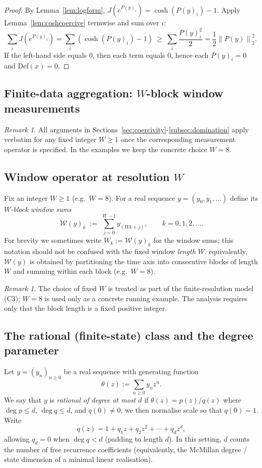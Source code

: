 \documentclass[11pt,reqno]{amsart}
\theoremstyle{definition}
\theoremstyle{remark}
\newtheorem{remark}[theorem]{Remark} %
\newcommand{\1}{\mathbf{1}}
\newcommand{\norm}[1]{\left\lVert #1 \right\rVert}
\begin{document}
\begin{proof}
By Lemma~\ref{lem:logform}, $J(e^{P(y)_i})=\cosh(P(y)_i)-1$.
Apply Lemma~\ref{lem:coshcoercive} termwise and sum over $i$:
\[
\sum_i J(e^{P(y)_i})=\sum_i(\cosh(P(y)_i)-1)\ \geq\ \sum_i \frac{P(y)_i^2}{2}
=\frac12 \norm{P(y)}_2^2.
\]
If the left-hand side equals $0$, then each term equals $0$, hence each $P(y)_i=0$ and $\mathrm{Def}(x)=0$.
\end{proof}

\subsection{\texorpdfstring{Finite-data aggregation: $W$-block window measurements}{Finite-data aggregation: W-block window measurements}}\label{sec:aggregation}

\begin{remark}\label{rem:Wparam}
All arguments in Sections~\ref{sec:coercivity}-\ref{subsec:domination} apply verbatim for any fixed
integer $W\geq 1$ once the corresponding measurement operator is specified.
In the examples we keep the concrete choice $W=8$.
\end{remark}

\subsection{\texorpdfstring{Window operator at resolution $W$}{Window operator at resolution W}}
Fix an integer $W\ge 1$ (e.g.\ $W=8$). For a real sequence $y=(y_0,y_1,\dots)$ define its \emph{$W$-block window sums}
\begin{equation}\label{eq:window}
\mathcal{W}(y)_k \;:=\; \sum_{j=0}^{W-1} y_{(Wk+j)},\qquad k=0,1,2,\dots.
\end{equation}
For brevity we sometimes write $W_k:=\mathcal W(y)_k$ for the window sums; this notation should not be confused with the fixed window \emph{length} $W$.
equivalently, $\mathcal{W}(y)$ is obtained by partitioning the time axis into consecutive blocks
of length $W$ and summing within each block (e.g.\ $W=8$).
\begin{remark}
The choice of fixed $W$ is treated as part of the finite-resolution model (C3); $W=8$ is used only as a concrete running example. The analysis requires only that the block length is a fixed positive integer.
\end{remark}

\subsection{The rational (finite-state) class and the degree parameter}
\label{subsec:rational-class}
Let $y=(y_n)_{n\geq 0}$ be a real sequence with generating function
\[
\theta(z):=\sum_{n\geq 0} y_n z^n.
\]
We say that $y$ is \emph{rational of degree at most $d$} if $\theta(z)=p(z)/q(z)$ where
$\deg p\le d$, $\deg q\le d$, and $q(0)\neq 0$; we then normalise scale so that $q(0)=1$.
Write
\[
q(z)=1+q_1 z+q_2 z^2+\cdots+q_d z^d,
\]
allowing $q_d=0$ when $\deg q<d$ (padding to length $d$). In this setting, $d$ counts the number of
free recurrence coefficients (equivalently, the McMillan degree / state dimension of a minimal
linear realisation).
\end{document}
